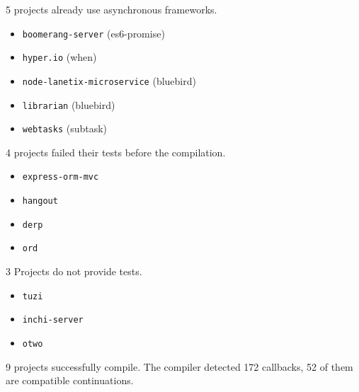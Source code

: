 5 projects already use asynchronous frameworks.
\begin{itemize}
\item \texttt{boomerang-server} (es6-promise)
\item \texttt{hyper.io} (when)
\item \texttt{node-lanetix-microservice} (bluebird)
\item \texttt{librarian} (bluebird)
\item \texttt{webtasks} (subtask)
\end{itemize}

4 projects failed their tests before the compilation.
\begin{itemize}
\item \texttt{express-orm-mvc}
\item \texttt{hangout}
\item \texttt{derp}
\item \texttt{ord}
\end{itemize}

3 Projects do not provide tests.
\begin{itemize}
\item \texttt{tuzi}
\item \texttt{inchi-server}
\item \texttt{otwo}
\end{itemize}

9 projects successfully compile.
The compiler detected 172 callbacks, 52 of them are compatible continuations.

